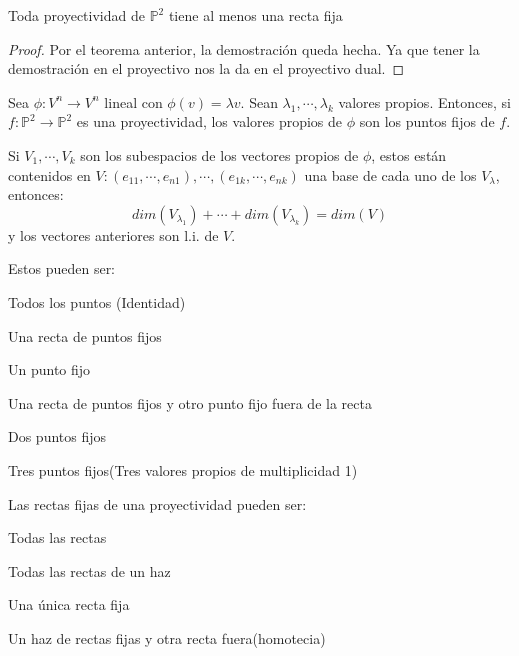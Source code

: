\begin{nth}[Dual]
	Toda proyectividad de $\mathbb P^2$ tiene al menos una recta fija
\end{nth}
\begin{proof}
	Por el teorema anterior, la demostración queda hecha. Ya que tener la demostración en el proyectivo nos la da en el proyectivo dual.
\end{proof}


\begin{nota}
	Sea $\phi: V^n \to V^n $ lineal con $\phi(v) = \lambda v$. Sean $\lambda_1,\cdots,\lambda_k$ valores propios. Entonces, si $f:\mathbb P^2 \to \mathbb P^2$ es una proyectividad, los valores propios de $\phi$ son los puntos fijos de $f$.
\end{nota}

\begin{nota}
	Si $V_1,\cdots,V_k$ son los subespacios de los vectores propios de $\phi$, estos están contenidos en $V:(e_{11},\cdots,e_{n1}), \cdots, (e_{1k},\cdots,e_{nk})$ una base de cada uno de los $V_\lambda$, entonces:
	\[
	dim(V_{\lambda_1}) + \cdots + dim(V_{\lambda_k}) = dim(V)
	\]
	y los vectores anteriores son l.i. de $V$.
\end{nota}


\begin{nprop}
	Estos pueden ser:
	\begin{nlist}
	\item Todos los puntos (Identidad)
	\item Una recta de puntos fijos
	\item Un punto fijo
	\item Una recta de puntos fijos y otro punto fijo fuera de la recta
	\item Dos puntos fijos
	\item Tres puntos fijos(Tres valores propios de multiplicidad 1)

\end{nlist}
\end{nprop}

\begin{nth}
	Las rectas fijas de una proyectividad pueden ser:
	\begin{nlist}
	\item Todas las rectas
	\item Todas las rectas de un haz
	\item Una única recta fija
	\item Un haz de rectas fijas y otra recta fuera(homotecia)
\end{nlist}
\end{nth}

